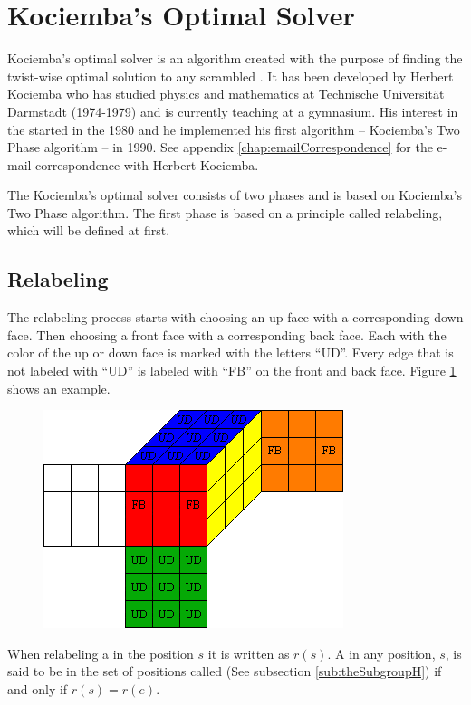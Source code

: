 \section{Kociemba's Optimal Solver}
\label{sec:kociemba}
Kociemba's optimal solver is an algorithm created with the purpose of finding the twist-wise optimal solution to any scrambled \rubik{}\cite{kociemba09} \cite{cubelovers92}. It has been developed by Herbert Kociemba who has studied physics and mathematics at Technische Universit\"{a}t Darmstadt\cite{TUD} (1974-1979) and is currently teaching at a gymnasium. His interest in the \rubik{} started in the 1980 and he implemented his first algorithm -- Kociemba's Two Phase algorithm -- in 1990. See appendix  \ref{chap:emailCorrespondence} for the e-mail correspondence with Herbert Kociemba.

The Kociemba's optimal solver consists of two phases and is based on Kociemba's Two Phase algorithm. The first phase is based on a principle called relabeling, which will be defined at first. 


\subsection{Relabeling}
The relabeling process  starts with choosing an up face with a corresponding down face. Then choosing a front face with a corresponding back face. Each \facelet{} with the color of the up or down face is marked with the letters ``UD''.  %
Every edge \cpiece{} that is not labeled with "`UD"' is labeled with "`FB"' on the front and back face.
Figure \ref{fig:relabelClean} shows an example.
\begin{figure}[!hbt]
	\centering
		\includegraphics[scale = 0.8]{input/pics/relabelClean}
	\caption{}
	\label{fig:relabelClean}
\end{figure}
When relabeling a \rubik{} in the position $s$ it is written as $r(s)$. A \rubik{} in any position, $s$, is said to be in the set of positions called (See subsection \ref{sub:theSubgroupH}) if and only if $r(s)=r(e)$.

